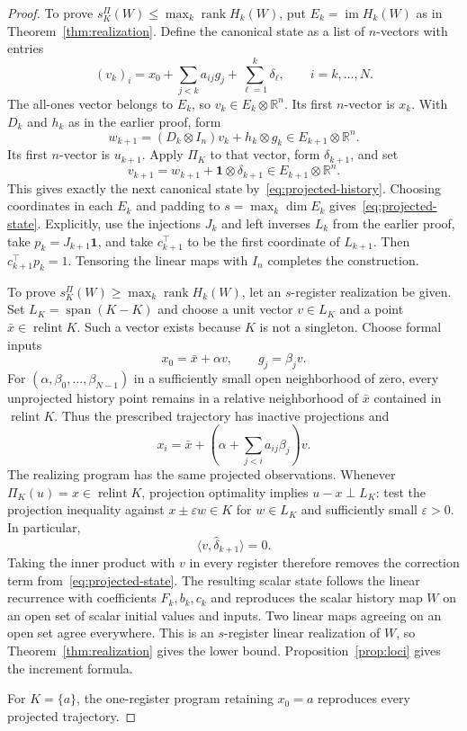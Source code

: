 \documentclass[11pt]{article}
\numberwithin{equation}{section}
\theoremstyle{definition}
\newcommand{\R}{\mathbb R}
\DeclareMathOperator{\rank}{rank}
\DeclareMathOperator{\im}{im}
\begin{document}
\begin{proof}
To prove $s_K^\Pi(W)\le\max_k\rank H_k(W)$, put $E_k=\im H_k(W)$ as in Theorem~\ref{thm:realization}. Define the canonical state as a list of $n$-vectors with entries
\[
 (v_k)_i=x_0+\sum_{j<k}a_{ij}g_j+
                  \sum_{\ell=1}^k\delta_\ell,
 \qquad i=k,\ldots,N.
\]
The all-ones vector belongs to $E_k$, so $v_k\in E_k\otimes\R^n$. Its first $n$-vector is $x_k$. With $D_k$ and $h_k$ as in the earlier proof, form
\[
 w_{k+1}=(D_k\otimes I_n)v_k+h_k\otimes g_k
 \in E_{k+1}\otimes\R^n.
\]
Its first $n$-vector is $u_{k+1}$. Apply $\Pi_K$ to that vector, form $\delta_{k+1}$, and set
\[
 v_{k+1}=w_{k+1}+\mathbf 1\otimes\delta_{k+1}
 \in E_{k+1}\otimes\R^n.
\]
This gives exactly the next canonical state by~\eqref{eq:projected-history}. Choosing coordinates in each $E_k$ and padding to $s=\max_k\dim E_k$ gives~\eqref{eq:projected-state}. Explicitly, use the injections $J_k$ and left inverses $L_k$ from the earlier proof, take $p_k=J_{k+1}\mathbf 1$, and take $c_{k+1}^\top$ to be the first coordinate of $L_{k+1}$. Then $c_{k+1}^\top p_k=1$. Tensoring the linear maps with $I_n$ completes the construction.

To prove $s_K^\Pi(W)\ge\max_k\rank H_k(W)$, let an $s$-register realization be given. Set $L_K=\operatorname{span}(K-K)$ and choose a unit vector $v\in L_K$ and a point $\bar x\in\operatorname{relint}K$. Such a vector exists because $K$ is not a singleton. Choose formal inputs
\[
 x_0=\bar x+\alpha v,\qquad g_j=\beta_jv.
\]
For $(\alpha,\beta_0,\ldots,\beta_{N-1})$ in a sufficiently small open neighborhood of zero, every unprojected history point remains in a relative neighborhood of $\bar x$ contained in $\operatorname{relint}K$. Thus the prescribed trajectory has inactive projections and
\[
 x_i=\bar x+\left(\alpha+\sum_{j<i}a_{ij}\beta_j\right)v.
\]
The realizing program has the same projected observations. Whenever $\Pi_K(u)=x\in\operatorname{relint}K$, projection optimality implies $u-x\perp L_K$: test the projection inequality against $x\pm\varepsilon w\in K$ for $w\in L_K$ and sufficiently small $\varepsilon>0$. In particular,
\[
 \langle v,\widehat\delta_{k+1}\rangle=0.
\]
Taking the inner product with $v$ in every register therefore removes the correction term from~\eqref{eq:projected-state}. The resulting scalar state follows the linear recurrence with coefficients $F_k,b_k,c_k$ and reproduces the scalar history map $W$ on an open set of scalar initial values and inputs. Two linear maps agreeing on an open set agree everywhere. This is an $s$-register linear realization of $W$, so Theorem~\ref{thm:realization} gives the lower bound. Proposition~\ref{prop:loci} gives the increment formula.

For $K=\{a\}$, the one-register program retaining $x_0=a$ reproduces every projected trajectory.
\end{proof}
\end{document}
